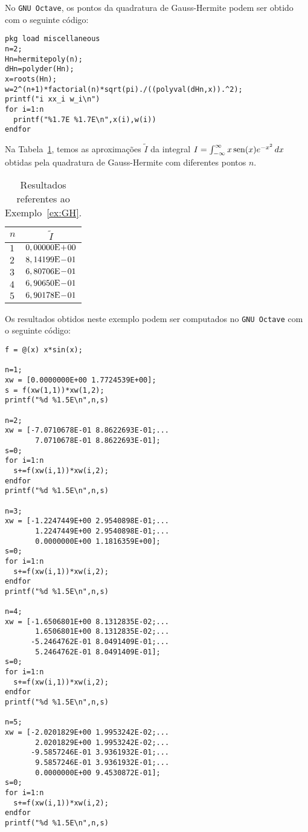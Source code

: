 \ifisoctave
No \verb+GNU Octave+, os pontos da quadratura de Gauss-Hermite podem ser obtido com o seguinte código:
\begin{verbatim}
pkg load miscellaneous
n=2;
Hn=hermitepoly(n);
dHn=polyder(Hn);
x=roots(Hn);
w=2^(n+1)*factorial(n)*sqrt(pi)./((polyval(dHn,x)).^2);
printf("i xx_i w_i\n")
for i=1:n
  printf("%1.7E %1.7E\n",x(i),w(i))
endfor
\end{verbatim}
\fi

\begin{ex}\label{ex:GH}
  Na Tabela~\ref{tab:ex_GH}, temos as aproximações $\tilde{I}$ da integral $I = \int_{-\infty}^\infty x\operatorname{sen}(x)e^{-x^2}\,dx$ obtidas pela quadratura de Gauss-Hermite com diferentes pontos $n$.

\begin{table}[h!]
  \centering
  \begin{tabular}{lc}
    $n$ & $\tilde{I}$\\\hline
    $1$ & $0,00000\mathrm{E}\!+\!00$ \\
    $2$ & $8,14199\mathrm{E}\!-\!01$ \\
    $3$ & $6,80706\mathrm{E}\!-\!01$ \\
    $4$ & $6,90650\mathrm{E}\!-\!01$ \\
    $5$ & $6,90178\mathrm{E}\!-\!01$
  \end{tabular}
  \caption{Resultados referentes ao Exemplo~\ref{ex:GH}.}
  \label{tab:ex_GH}
\end{table}

\ifisoctave
Os resultados obtidos neste exemplo podem ser computados no \verb+GNU Octave+ com o seguinte código:
\begin{verbatim}
f = @(x) x*sin(x);

n=1;
xw = [0.0000000E+00 1.7724539E+00];
s = f(xw(1,1))*xw(1,2);
printf("%d %1.5E\n",n,s)

n=2;
xw = [-7.0710678E-01 8.8622693E-01;...
       7.0710678E-01 8.8622693E-01];
s=0;
for i=1:n
  s+=f(xw(i,1))*xw(i,2);
endfor
printf("%d %1.5E\n",n,s)

n=3;
xw = [-1.2247449E+00 2.9540898E-01;...
       1.2247449E+00 2.9540898E-01;...
       0.0000000E+00 1.1816359E+00];
s=0;
for i=1:n
  s+=f(xw(i,1))*xw(i,2);
endfor
printf("%d %1.5E\n",n,s)

n=4;
xw = [-1.6506801E+00 8.1312835E-02;...
       1.6506801E+00 8.1312835E-02;...
      -5.2464762E-01 8.0491409E-01;...
       5.2464762E-01 8.0491409E-01];
s=0;
for i=1:n
  s+=f(xw(i,1))*xw(i,2);
endfor
printf("%d %1.5E\n",n,s)

n=5;
xw = [-2.0201829E+00 1.9953242E-02;...
       2.0201829E+00 1.9953242E-02;...
      -9.5857246E-01 3.9361932E-01;...
       9.5857246E-01 3.9361932E-01;...
       0.0000000E+00 9.4530872E-01];
s=0;
for i=1:n
  s+=f(xw(i,1))*xw(i,2);
endfor
printf("%d %1.5E\n",n,s)
\end{verbatim}
\fi
\end{ex}

